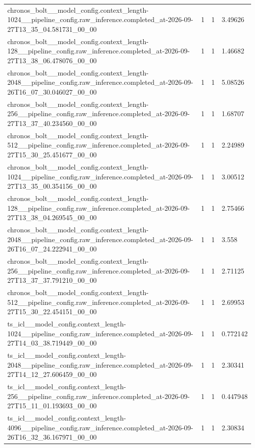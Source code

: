 \begin{tabular}{llll}
chronos\_bolt\_\_model\_config.context\_length-1024\_\_pipeline\_config.raw\_inference.completed\_at-2026-09-27T13\_35\_04.581731\_00\_00 & 1 & 1 & 3.49626 \\
chronos\_bolt\_\_model\_config.context\_length-128\_\_pipeline\_config.raw\_inference.completed\_at-2026-09-27T13\_38\_06.478076\_00\_00 & 1 & 1 & 1.46682 \\
chronos\_bolt\_\_model\_config.context\_length-2048\_\_pipeline\_config.raw\_inference.completed\_at-2026-09-26T16\_07\_30.046027\_00\_00 & 1 & 1 & 5.08526 \\
chronos\_bolt\_\_model\_config.context\_length-256\_\_pipeline\_config.raw\_inference.completed\_at-2026-09-27T13\_37\_40.234560\_00\_00 & 1 & 1 & 1.68707 \\
chronos\_bolt\_\_model\_config.context\_length-512\_\_pipeline\_config.raw\_inference.completed\_at-2026-09-27T15\_30\_25.451677\_00\_00 & 1 & 1 & 2.24989 \\
chronos\_bolt\_\_model\_config.context\_length-1024\_\_pipeline\_config.raw\_inference.completed\_at-2026-09-27T13\_35\_00.354156\_00\_00 & 1 & 1 & 3.00512 \\
chronos\_bolt\_\_model\_config.context\_length-128\_\_pipeline\_config.raw\_inference.completed\_at-2026-09-27T13\_38\_04.269545\_00\_00 & 1 & 1 & 2.75466 \\
chronos\_bolt\_\_model\_config.context\_length-2048\_\_pipeline\_config.raw\_inference.completed\_at-2026-09-26T16\_07\_24.222941\_00\_00 & 1 & 1 & 3.558 \\
chronos\_bolt\_\_model\_config.context\_length-256\_\_pipeline\_config.raw\_inference.completed\_at-2026-09-27T13\_37\_37.791210\_00\_00 & 1 & 1 & 2.71125 \\
chronos\_bolt\_\_model\_config.context\_length-512\_\_pipeline\_config.raw\_inference.completed\_at-2026-09-27T15\_30\_22.454151\_00\_00 & 1 & 1 & 2.69953 \\
ts\_icl\_\_model\_config.context\_length-1024\_\_pipeline\_config.raw\_inference.completed\_at-2026-09-27T14\_03\_38.719449\_00\_00 & 1 & 1 & 0.772142 \\
ts\_icl\_\_model\_config.context\_length-2048\_\_pipeline\_config.raw\_inference.completed\_at-2026-09-27T14\_12\_27.606459\_00\_00 & 1 & 1 & 2.30341 \\
ts\_icl\_\_model\_config.context\_length-256\_\_pipeline\_config.raw\_inference.completed\_at-2026-09-27T15\_11\_01.193693\_00\_00 & 1 & 1 & 0.447948 \\
ts\_icl\_\_model\_config.context\_length-4096\_\_pipeline\_config.raw\_inference.completed\_at-2026-09-26T16\_32\_36.167971\_00\_00 & 1 & 1 & 2.30834 \\

\end{tabular}
